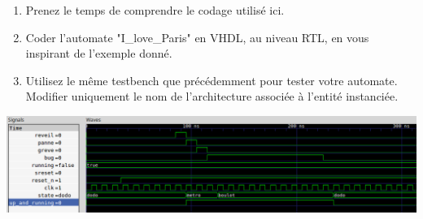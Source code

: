 \documentclass[a4paper,11pt]{article}
\begin{document}
\begin{enumerate}
  \item Prenez le temps de comprendre le codage utilisé ici.
  \item Coder l'automate "I\_love\_Paris" en VHDL, au niveau RTL, en vous inspirant de l'exemple donné.
  \item Utilisez le même testbench que précédemment pour tester votre automate. Modifier uniquement le nom de l'architecture associée à l'entité instanciée.
\end{enumerate}


\lstset{inputencoding=utf8}


\begin{minipage}[t]{17cm}
  \vspace{40pt}
  \includegraphics[width=16cm]{./metro_boulot_dodo_chrono.png}
\end{minipage}
\end{document}
